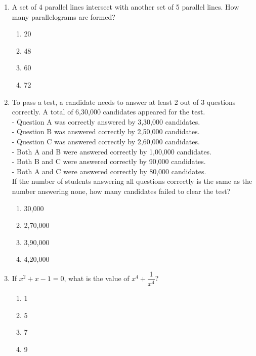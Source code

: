 \documentclass{article}
\begin{document}
\begin{enumerate}
\item A set of 4 parallel lines intersect with another set of 5 parallel lines. How many parallelograms are formed?  

\begin{multicols}{4}
\begin{enumerate}
\item 20
\item 48
\item 60
\item 72
\end{enumerate}
\end{multicols}

\item To pass a test, a candidate needs to answer at least 2 out of 3 questions correctly.  
A total of 6,30,000 candidates appeared for the test. \\ 

- Question A was correctly answered by 3,30,000 candidates.  \\
- Question B was answered correctly by 2,50,000 candidates.  \\
- Question C was answered correctly by 2,60,000 candidates.  \\
- Both A and B were answered correctly by 1,00,000 candidates. \\
- Both B and C were answered correctly by 90,000 candidates.  \\
- Both A and C were answered correctly by 80,000 candidates.  \\

If the number of students answering all questions correctly is the same as the number answering none, how many candidates failed to clear the test?  

\begin{multicols}{4}
\begin{enumerate}
\item 30,000
\item 2,70,000
\item 3,90,000
\item 4,20,000
\end{enumerate}
\end{multicols}

\item If $x^2 + x - 1 = 0$, what is the value of $x^4 + \dfrac{1}{x^4}$?  

\begin{multicols}{4}
\begin{enumerate}
\item 1
\item 5
\item 7
\item 9
\end{enumerate}
\end{multicols}


\end{enumerate}
\end{document}
